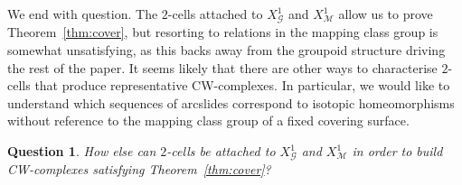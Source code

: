 \documentclass{amsart}
\newtheorem{question}[theorem]{Question}
\theoremstyle{definition}
\begin{document}
We end with question.  The $2$-cells attached to $X^1_\mathcal{G}$ and $X^1_\mathcal{M}$ allow us to prove Theorem~\ref{thm:cover}, but resorting to relations  in the mapping class group is somewhat unsatisfying, as this backs away from the groupoid structure driving the rest of the paper.  It seems likely that there are other ways to characterise $2$-cells that produce representative CW-complexes.  In particular, we would like to understand which sequences of arcslides correspond to isotopic homeomorphisms without reference to the mapping class group of a fixed covering surface.

\begin{question} How else can $2$-cells be attached to $X^1_\mathcal{G}$ and $X^1_\mathcal{M}$ in order to build CW-complexes satisfying Theorem~\ref{thm:cover}?
\end{question}





\end{document}
